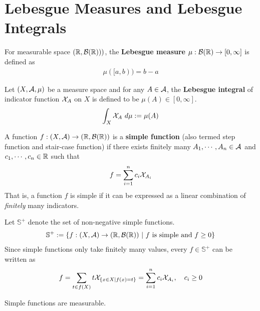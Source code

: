 \documentclass[11pt]{article}
\begin{document}
	\section{Lebesgue Measures and Lebesgue Integrals}
	\begin{definition}
	    For measurable space $(\mathbb{R}, \mathcal{{B}}(\mathbb{R})))$, the \textbf{Lebesgue measure} $\mu: \mathcal{{B}}(\mathbb{R}) \to [0, \infty]$ is defined as
	    \begin{align}
	        \mu([a, b)) = b - a
	    \end{align}
	\end{definition}
	
	\begin{definition}
		Let $(X, \mathcal{{A}}, \mu)$ be a measure space and for any $A \in \mathcal{{A}}$, the \textbf{Lebesgue integral} of indicator function $\mathcal{{X}}_A$ on $X$ is defined to be $\mu(A) \in [0, \infty]$.
		\begin{align}
			\int_X \mathcal{{X}}_A\ d\mu := \mu(A)
		\end{align}
	\end{definition}
	
	\begin{definition}
		A function $f: (X, \mathcal{{A}}) \to (\mathbb{R}, \mathcal{{B}}(\mathbb{R}))$ is a \textbf{simple function} (also termed step function and stair-case function) if there exists finitely many $A_1, \cdots, A_n \in \mathcal{{A}}$ and $c_1, \cdots, c_n \in \mathbb{R}$ such that
		\begin{align}
			f = \sum_{i=1}^n c_i \mathcal{{X}}_{A_i}
		\end{align}
		That is, a function $f$ is simple if it can be expressed as a linear combination of \emph{finitely} many indicators.
		
		Let $\mathbb{S}^+$ denote the set of non-negative simple functions.
		\begin{align}
			\mathbb{S}^+ := \left\{
				f: (X, \mathcal{{A}}) \to (\mathbb{R}, \mathcal{{B}}(\mathbb{R}))\ \vert\ f \text{{ is simple and }} f \geq 0
			\right\}
		\end{align}
		Since simple functions only take finitely many values, every $f \in \mathbb{S}^+$ can be written as
		\begin{align}
			f = \sum_{t \in f(X)} t \mathcal{{X}}_{\{x\in X|f(x) = t\}} = \sum_{i=1}^n c_i \mathcal{{X}}_{A_i}, \quad c_i \geq 0
		\end{align}
	\end{definition}
	
	\begin{theorem}
		Simple functions are measurable.
	\end{theorem}
\end{document}
